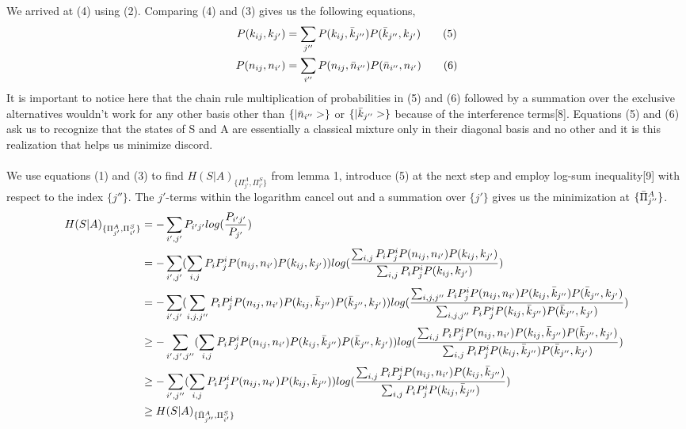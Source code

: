 \documentclass[8pt]{article}
\begin{document}
We arrived at (4) using (2). Comparing (4) and (3) gives us the following equations,
\begin{align*}
P(k_{ij},k_{j'}) &= \sum_{j''}P(k_{ij},\Bar{k}_{j''})P(\Bar{k}_{j''},k_{j'}) \tag{5}\\
P(n_{ij},n_{i'}) &= \sum_{i''}P(n_{ij},\Bar{n}_{i''})P(\Bar{n}_{i''},n_{i'}) \tag{6}
\end{align*}
It is important to notice here that the chain rule multiplication of probabilities in (5) and (6) followed by a summation over the exclusive alternatives wouldn't work for any other basis other than $\{|\Bar{n}_{i''}>\}$ or $\{|\Bar{k}_{j''}>\}$ because of the interference terms[8]. Equations (5) and (6) ask us to recognize that the states of S and A are essentially a classical mixture only in their diagonal basis and no other and it is this realization that helps us minimize discord.\\
\\
We use equations (1) and (3) to find ${H(S|A)}_{\{{\Pi}^{A}_{j'},{\Pi}^{S}_{i'}\}}$ from lemma 1, introduce (5) at the next step and employ log-sum inequality[9] with respect to the index $\{j''\}$. The $j'$-terms within the logarithm cancel out and a summation over $\{j'\}$ gives us the minimization at ${\{\Bar{{\Pi}}^{A}_{j''}}\}$.
\begin{align*}
{H(S|A)}_{\{{\Pi}^{A}_{j'},{\Pi}^{S}_{i'}\}} &= -\sum_{i',j'}P_{i'j'}log(\frac{P_{i'j'}}{P_{j'}})\\
&= -\sum_{i',j'}({ \sum_{i,j}P_{i}P^{i}_{j}P(n_{ij},n_{i'})P(k_{ij},k_{j'})})log(\frac{ \sum_{i,j}P_{i}P^{i}_{j}P(n_{ij},n_{i'})P(k_{ij},k_{j'})}{\sum_{i,j}P_{i}P^{i}_{j}P(k_{ij},{k}_{j'})})\\
&= -\sum_{i',j'}({ \sum_{i,j,j''}P_{i}P^{i}_{j}P(n_{ij},n_{i'})P(k_{ij},\Bar{k}_{j''})P(\Bar{k}_{j''},k_{j'})})log(\frac{\sum_{i,j,j''}P_{i}P^{i}_{j}P(n_{ij},n_{i'})P(k_{ij},\Bar{k}_{j''})P(\Bar{k}_{j''},k_{j'})}{\sum_{i,j,j''}P_{i}P^{i}_{j}P(k_{ij},\Bar{k}_{j''})P(\Bar{k}_{j''},k_{j'})})\\
&\geq -\sum_{i',j',j''}({ \sum_{i,j}P_{i}P^{i}_{j}P(n_{ij},n_{i'})P(k_{ij},\Bar{k}_{j''})P(\Bar{k}_{j''},k_{j'})})log(\frac{\sum_{i,j}P_{i}P^{i}_{j}P(n_{ij},n_{i'})P(k_{ij},\Bar{k}_{j''})P(\Bar{k}_{j''},k_{j'})}{\sum_{i,j}P_{i}P^{i}_{j}P(k_{ij},\Bar{k}_{j''})P(\Bar{k}_{j''},k_{j'})})\\
&\geq -\sum_{i',j''}({ \sum_{i,j}P_{i}P^{i}_{j}P(n_{ij},n_{i'})P(k_{ij},\Bar{k}_{j''})})log(\frac{\sum_{i,j}P_{i}P^{i}_{j}P(n_{ij},n_{i'})P(k_{ij},\Bar{k}_{j''})}{\sum_{i,j}P_{i}P^{i}_{j}P(k_{ij},\Bar{k}_{j''})})\\
&\geq {H(S|A)}_{\{\Bar{{\Pi}}^{A}_{j''},{\Pi}^{S}_{i'}\}}
\end{align*}
\end{document}
